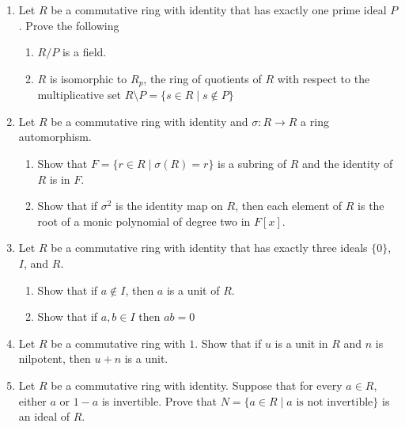 \documentclass{article}
\theoremstyle{definition}
\begin{document}
\begin{enumerate}
            \item Let $R$ be a commutative ring with identity that has exactly one prime ideal $P$. Prove the following
            
            \begin{enumerate}
                \item $R/P$ is a field.
                \item $R$ is isomorphic to $R_p$, the ring of quotients of $R$ with respect to the multiplicative set $R\setminus P=\{s\in R\mid s\notin P\}$
            \end{enumerate}

            \item Let $R$ be a commutative ring with identity and $\sigma : R\to R$ a ring automorphism.

            \begin{enumerate}
                \item Show that $F=\{r\in R \mid  \sigma (R)=r\}$ is a subring of $R$ and the identity of $R$ is in $F$.
                \item Show that if $\sigma^2$ is the identity map on $R$, then each element of $R$ is the root of a monic polynomial of degree two in $F[x]$.
            \end{enumerate}

            \item Let $R$ be a commutative ring with identity that has exactly three ideals $\{0\}$, $I$, and $R$.
            
            \begin{enumerate}
                \item Show that if $a\notin I$, then $a$ is a unit of $R$.
                \item Show that if $a,b \in I$ then $ab=0$
            \end{enumerate}

            \item Let $R$ be a commutative ring with $1$. Show that if $u$ is a unit in $R$ and $n$ is nilpotent, then $u+n$ is a unit.
            
            \item Let $R$ be a commutative ring with identity. Suppose that for every $a\in R$, either $a$ or $1-a$ is invertible. Prove that $N=\{a\in R\mid a \text{ is not invertible}\}$ is an ideal of $R$.
            

\end{enumerate}
\end{document}
